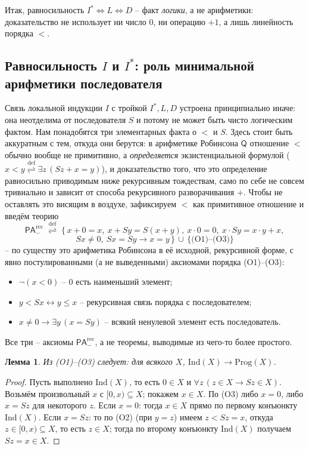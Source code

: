 \documentclass[12pt,a4paper]{article}
\theoremstyle{plain}
\newtheorem{lemma}[theorem]{Лемма}
\theoremstyle{definition}
\newcommand{\toinf}{\rightarrow}
\newcommand{\PA}{\textsf{PA}}
\newcommand{\PArec}{\PA^{\mathrm{rec}}_{-}}
\newcommand{\eqdef}{\mathrel{\overset{\mathrm{def}}{\rightleftharpoons}}}
\begin{document}
Итак, равносильность $I^*\iff L\iff D$ -- факт \emph{логики}, а не арифметики: доказательство не использует ни число $0$, ни операцию $+1$, а лишь линейность порядка $<$.

\subsection{Равносильность $I$ и $I^*$: роль минимальной арифметики последователя}
Связь локальной индукции $I$ с тройкой $I^*, L, D$ устроена принципиально иначе: она неотделима от последователя $S$ и потому не может быть чисто логическим фактом. Нам понадобятся три элементарных факта о $<$ и $S$. Здесь стоит быть аккуратным с тем, откуда они берутся: в арифметике Робинсона $\mathsf{Q}$ отношение $<$ обычно вообще не примитивно, а \emph{определяется} экзистенциальной формулой ($x<y \eqdef \exists z\,(Sz+x=y)$), и доказательство того, что это определение равносильно приводимым ниже рекурсивным тождествам, само по себе не совсем тривиально и зависит от способа рекурсивного разворачивания $+$. Чтобы не оставлять это висящим в воздухе, зафиксируем $<$ как примитивное отношение и введём теорию
$$\PArec \;\eqdef\; \big\{\,x+0=x,\ x+Sy=S(x+y),\ x\cdot0=0,\ x\cdot Sy=x\cdot y+x,$$
$$Sx\ne0,\ Sx=Sy\to x=y\,\big\} \,\cup\, \{\text{(O1)--(O3)}\}$$
-- по существу это арифметика Робинсона в её исходной, рекурсивной форме, с явно постулированными (а не выведенными) аксиомами порядка (O1)--(O3):
\begin{itemize}
    \item[(O1)] $\neg(x<0)$ -- $0$ есть наименьший элемент;
    \item[(O2)] $y<Sx \leftrightarrow y\leqslant x$ -- рекурсивная связь порядка с последователем;
    \item[(O3)] $x\ne0 \toinf \exists y\,(x=Sy)$ -- всякий ненулевой элемент есть последователь.
\end{itemize}
Все три -- аксиомы $\PArec$, а не теоремы, выводимые из чего-то более простого.

\begin{lemma}
Из (O1)--(O3) следует: для всякого $X$, $\mathrm{Ind}(X)\toinf\mathrm{Prog}(X)$.
\end{lemma}
\begin{proof}
Пусть выполнено $\mathrm{Ind}(X)$, то есть $0\in X$ и $\forall z\,(z\in X\toinf Sz\in X)$. Возьмём произвольный $x$ с $[0,x)\subseteq X$; покажем $x\in X$. По (O3) либо $x=0$, либо $x=Sz$ для некоторого $z$.
Если $x=0$: тогда $x\in X$ прямо по первому конъюнкту $\mathrm{Ind}(X)$.
Если $x=Sz$: то по (O2) (при $y=z$) имеем $z<Sz=x$, откуда $z\in[0,x)\subseteq X$, то есть $z\in X$; тогда по второму конъюнкту $\mathrm{Ind}(X)$ получаем $Sz=x\in X$.
\end{proof}
\end{document}
